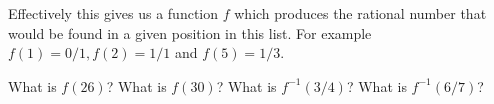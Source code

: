 \begin{enumerate}
Effectively this gives us a function $f$ which produces the rational number 
that would be found in a given position in this list.  For example 
$f(1) = 0/1, f(2) = 1/1$ and $f(5) = 1/3$.  

What is $f(26)$?  What is $f(30)$?  What is $f^{-1}(3/4)$? What is $f^{-1}(6/7)$?

\begin{center}

\end{center}
   
\end{enumerate}


